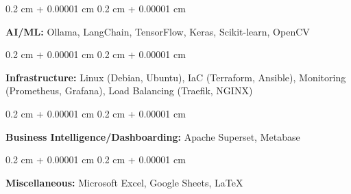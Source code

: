 \documentclass[10pt, a4paper]{article}
\newenvironment{onecolentry}{
    \begin{adjustwidth}{
        0.2 cm + 0.00001 cm
    }{
        0.2 cm + 0.00001 cm
    }
}{
    \end{adjustwidth}
} %
\begin{document}
        \vspace{0.2 cm}

        \begin{onecolentry}
            \textbf{AI/ML:} Ollama, LangChain, TensorFlow, Keras, Scikit-learn, OpenCV
        \end{onecolentry}

        \vspace{0.2 cm}

        \begin{onecolentry}
            \textbf{Infrastructure:} Linux (Debian, Ubuntu), IaC (Terraform, Ansible), Monitoring (Prometheus, Grafana),  Load Balancing (Traefik, NGINX)

        \end{onecolentry}

        \vspace{0.2 cm}

        \begin{onecolentry}
            \textbf{Business Intelligence/Dashboarding:} Apache Superset, Metabase
        \end{onecolentry}

        \vspace{0.2 cm}

        \begin{onecolentry}
            \textbf{Miscellaneous:} Microsoft Excel, Google Sheets, LaTeX
        \end{onecolentry}


    
\end{document}
